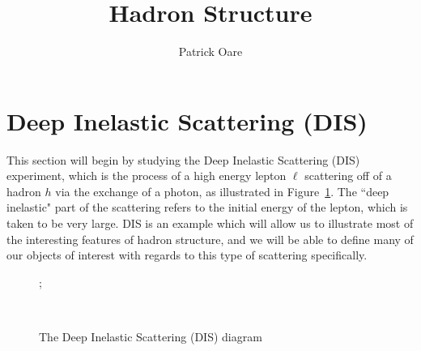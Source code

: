 \documentclass[11pt, oneside]{article}   	%
\title{Hadron Structure}
\author{Patrick Oare}
\date{}							%
\theoremstyle{definition}
\begin{document}
\maketitle

\section{Deep Inelastic Scattering (DIS)}

This section will begin by studying the Deep Inelastic Scattering (DIS) experiment, which is the process of a high energy 
lepton $\ell$ scattering off of a hadron $h$ via the exchange of a photon, as illustrated in Figure~\ref{fig:dis}. The ``deep 
inelastic" part of the scattering refers to the initial energy of the lepton, which is taken to be very large. DIS is an example 
which will allow us to illustrate most of the interesting features of hadron structure, and we will be able to define many of our 
objects of interest with regards to this type of scattering specifically. 

\begin{figure}[H]
\centering
{};
\caption{The Deep Inelastic Scattering (DIS) diagram}~
\label{fig:dis}
\end{figure}
\end{document}
